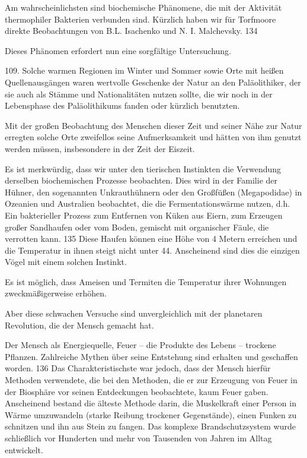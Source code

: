 \documentclass[11pt,a4paper]{book}
\begin{document}
Am wahrscheinlichsten sind biochemische Phänomene, die mit der Aktivität thermophiler Bakterien verbunden sind. Kürzlich haben wir für Torfmoore direkte Beobachtungen von B.L. Isachenko und N. I. Malchevsky. 134



Dieses Phänomen erfordert nun eine sorgfältige Untersuchung.



109. Solche warmen Regionen im Winter und Sommer sowie Orte mit heißen Quellenausgängen waren wertvolle Geschenke der Natur an den Paläolithiker, der sie auch als Stämme und Nationalitäten nutzen sollte, die wir noch in der Lebensphase des Paläolithikums fanden oder kürzlich benutzten.



Mit der großen Beobachtung des Menschen dieser Zeit und seiner Nähe zur Natur erregten solche Orte zweifellos seine Aufmerksamkeit und hätten von ihm genutzt werden müssen, insbesondere in der Zeit der Eiszeit.



Es ist merkwürdig, dass wir unter den tierischen Instinkten die Verwendung derselben biochemischen Prozesse beobachten. Dies wird in der Familie der Hühner, den sogenannten Unkrauthühnern oder den Großfüßen (Megapodidae) in Ozeanien und Australien beobachtet, die die Fermentationswärme nutzen, d.h. Ein bakterieller Prozess zum Entfernen von Küken aus Eiern, zum Erzeugen großer Sandhaufen oder vom Boden, gemischt mit organischer Fäule, die verrotten kann. 135 Diese Haufen können eine Höhe von 4 Metern erreichen und die Temperatur in ihnen steigt nicht unter 44. Anscheinend sind dies die einzigen Vögel mit einem solchen Instinkt.



Es ist möglich, dass Ameisen und Termiten die Temperatur ihrer Wohnungen zweckmäßigerweise erhöhen.



Aber diese schwachen Versuche sind unvergleichlich mit der planetaren Revolution, die der Mensch gemacht hat.



Der Mensch als Energiequelle, Feuer -- die Produkte des Lebens -- trockene Pflanzen. Zahlreiche Mythen über seine Entstehung sind erhalten und geschaffen worden. 136 Das Charakteristischste war jedoch, dass der Mensch hierfür Methoden verwendete, die bei den Methoden, die er zur Erzeugung von Feuer in der Biosphäre vor seinen Entdeckungen beobachtete, kaum Feuer gaben. Anscheinend bestand die älteste Methode darin, die Muskelkraft einer Person in Wärme umzuwandeln (starke Reibung trockener Gegenstände), einen Funken zu schnitzen und ihn aus Stein zu fangen. Das komplexe Brandschutzsystem wurde schließlich vor Hunderten und mehr von Tausenden von Jahren im Alltag entwickelt.
\end{document}
